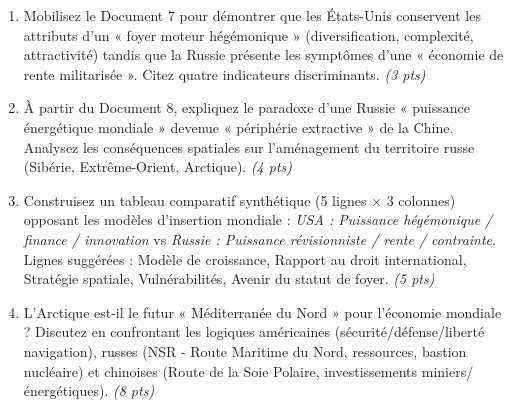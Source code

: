 \documentclass[11pt]{article}
\begin{document}
\begin{exercice}
    \begin{enumerate}
        \item Mobilisez le Document 7 pour démontrer que les États-Unis conservent les attributs d'un « foyer moteur hégémonique » (diversification, complexité, attractivité) tandis que la Russie présente les symptômes d'une « économie de rente militarisée ». Citez quatre indicateurs discriminants. \textit{(3 pts)}
        \item À partir du Document 8, expliquez le paradoxe d'une Russie « puissance énergétique mondiale » devenue « périphérie extractive » de la Chine. Analysez les conséquences spatiales sur l'aménagement du territoire russe (Sibérie, Extrême-Orient, Arctique). \textit{(4 pts)}
        \item Construisez un tableau comparatif synthétique (5 lignes $\times$ 3 colonnes) opposant les modèles d'insertion mondiale : \textit{USA : Puissance hégémonique / finance / innovation} vs \textit{Russie : Puissance révisionniste / rente / contrainte}. Lignes suggérées : Modèle de croissance, Rapport au droit international, Stratégie spatiale, Vulnérabilités, Avenir du statut de foyer. \textit{(5 pts)}
        \item L'Arctique est-il le futur « Méditerranée du Nord » pour l'économie mondiale ? Discutez en confrontant les logiques américaines (sécurité/défense/liberté navigation), russes (NSR - Route Maritime du Nord, ressources, bastion nucléaire) et chinoises (Route de la Soie Polaire, investissements miniers/énergétiques). \textit{(8 pts)}
    \end{enumerate}
\end{exercice}
\end{document}
